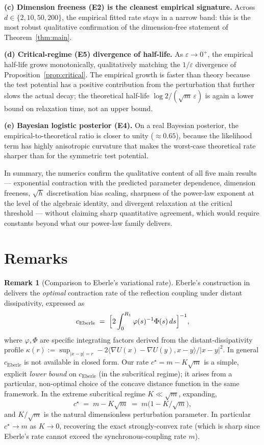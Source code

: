\documentclass[11pt]{article}
\theoremstyle{definition}
\newtheorem{remark}[theorem]{Remark}
\newcommand{\abs}[1]{\left\lvert #1 \right\rvert}
\begin{document}
\textbf{(c) Dimension freeness (E2) is the cleanest empirical signature.} Across $d \in \{2, 10, 50, 200\}$, the empirical fitted rate stays in a narrow band: this is the most robust qualitative confirmation of the dimension-free statement of Theorem~\ref{thm:main}.

\textbf{(d) Critical-regime (E5) divergence of half-life.} As $\varepsilon \to 0^+$, the empirical half-life grows monotonically, qualitatively matching the $1/\varepsilon$ divergence of Proposition~\ref{prop:critical}. The empirical growth is faster than theory because the test potential has a positive contribution from the perturbation that further slows the actual decay; the theoretical half-life $\log 2/(\sqrt m\,\varepsilon)$ is again a lower bound on relaxation time, not an upper bound.

\textbf{(e) Bayesian logistic posterior (E4).} On a real Bayesian posterior, the empirical-to-theoretical ratio is closer to unity ($\approx 0.65$), because the likelihood term has highly anisotropic curvature that makes the worst-case theoretical rate sharper than for the symmetric test potential.

In summary, the numerics confirm the qualitative content of all five main results --- exponential contraction with the predicted parameter dependence, dimension freeness, $\sqrt h$ discretisation bias scaling, sharpness of the power-law exponent at the level of the algebraic identity, and divergent relaxation at the critical threshold --- without claiming sharp quantitative agreement, which would require constants beyond what our power-law family delivers.

\section{Remarks}\label{sec:remarks}

\begin{remark}[Comparison to Eberle's variational rate]\label{rmk:eberle-compare}
Eberle's construction in \cite{Eberle2016} delivers the \emph{optimal} contraction rate of the reflection coupling under distant dissipativity, expressed as
\[
c_{\mathrm{Eberle}} \;=\; \Bigl[2\int_0^{R_1}\varphi(s)^{-1}\Phi(s)\,ds\Bigr]^{-1},
\]
where $\varphi, \Phi$ are specific integrating factors derived from the distant-dissipativity profile $\kappa(r) := \sup_{\abs{x-y} = r} -2\langle \nabla U(x)-\nabla U(y), x-y\rangle/\abs{x-y}^2$. In general $c_{\mathrm{Eberle}}$ is not available in closed form. Our rate $c^\star = m - K\sqrt m$ is a simple, explicit \emph{lower bound} on $c_{\mathrm{Eberle}}$ (in the subcritical regime); it arises from a particular, non-optimal choice of the concave distance function in the same framework. In the extreme subcritical regime $K \ll \sqrt m$, expanding,
\[
c^\star \;=\; m - K\sqrt m \;=\; m\bigl(1 - K/\sqrt m\bigr),
\]
and $K/\sqrt m$ is the natural dimensionless perturbation parameter. In particular $c^\star \to m$ as $K \to 0$, recovering the exact strongly-convex rate (which is sharp since Eberle's rate cannot exceed the synchronous-coupling rate $m$).
\end{remark}
\end{document}
